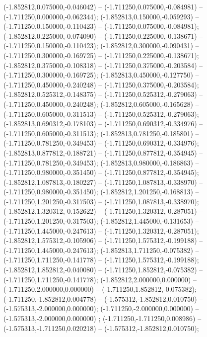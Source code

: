  (-1.852812,0.075000,-0.046042) -- (-1.711250,0.075000,-0.084981) -- (-1.711250,0.000000,-0.062344);
 (-1.852813,0.150000,-0.059293) -- (-1.711250,0.150000,-0.110423) -- (-1.711250,0.075000,-0.084981);
 (-1.852812,0.225000,-0.074090) -- (-1.711250,0.225000,-0.138671) -- (-1.711250,0.150000,-0.110423);
 (-1.852812,0.300000,-0.090431) -- (-1.711250,0.300000,-0.169725) -- (-1.711250,0.225000,-0.138671);
 (-1.852812,0.375000,-0.108318) -- (-1.711250,0.375000,-0.203584) -- (-1.711250,0.300000,-0.169725);
 (-1.852813,0.450000,-0.127750) -- (-1.711250,0.450000,-0.240248) -- (-1.711250,0.375000,-0.203584);
 (-1.852812,0.525312,-0.148375) -- (-1.711250,0.525312,-0.279063) -- (-1.711250,0.450000,-0.240248);
 (-1.852812,0.605000,-0.165628) -- (-1.711250,0.605000,-0.311513) -- (-1.711250,0.525312,-0.279063);
 (-1.852813,0.690312,-0.178103) -- (-1.711250,0.690312,-0.334976) -- (-1.711250,0.605000,-0.311513);
 (-1.852813,0.781250,-0.185801) -- (-1.711250,0.781250,-0.349453) -- (-1.711250,0.690312,-0.334976);
 (-1.852813,0.877812,-0.188721) -- (-1.711250,0.877812,-0.354945) -- (-1.711250,0.781250,-0.349453);
 (-1.852813,0.980000,-0.186863) -- (-1.711250,0.980000,-0.351450) -- (-1.711250,0.877812,-0.354945);
 (-1.852812,1.087813,-0.180227) -- (-1.711250,1.087813,-0.338970) -- (-1.711250,0.980000,-0.351450);
 (-1.852812,1.201250,-0.168813) -- (-1.711250,1.201250,-0.317503) -- (-1.711250,1.087813,-0.338970);
 (-1.852812,1.320312,-0.152622) -- (-1.711250,1.320312,-0.287051) -- (-1.711250,1.201250,-0.317503);
 (-1.852812,1.445000,-0.131653) -- (-1.711250,1.445000,-0.247613) -- (-1.711250,1.320312,-0.287051);
 (-1.852812,1.575312,-0.105906) -- (-1.711250,1.575312,-0.199188) -- (-1.711250,1.445000,-0.247613);
 (-1.852813,1.711250,-0.075382) -- (-1.711250,1.711250,-0.141778) -- (-1.711250,1.575312,-0.199188);
 (-1.852812,1.852812,-0.040080) -- (-1.711250,1.852812,-0.075382) -- (-1.711250,1.711250,-0.141778);
 (-1.852812,2.000000,0.000000) -- (-1.711250,2.000000,0.000000) -- (-1.711250,1.852812,-0.075382);
 (-1.711250,-1.852812,0.004778) -- (-1.575312,-1.852812,0.010750) -- (-1.575313,-2.000000,0.000000);
 (-1.711250,-2.000000,0.000000) -- (-1.575313,-2.000000,0.000000) ;
 (-1.711250,-1.711250,0.008986) -- (-1.575313,-1.711250,0.020218) -- (-1.575312,-1.852812,0.010750);
